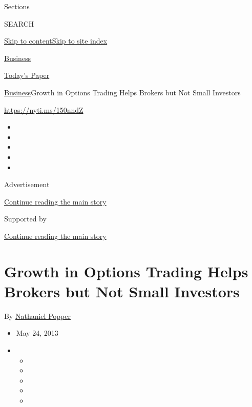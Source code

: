 Sections

SEARCH

\protect\hyperlink{site-content}{Skip to
content}\protect\hyperlink{site-index}{Skip to site index}

\href{https://www.nytimes3xbfgragh.onion/section/business}{Business}

\href{https://myaccount.nytimes3xbfgragh.onion/auth/login?response_type=cookie\&client_id=vi}{}

\href{https://www.nytimes3xbfgragh.onion/section/todayspaper}{Today's
Paper}

\href{/section/business}{Business}\textbar{}Growth in Options Trading
Helps Brokers but Not Small Investors

\url{https://nyti.ms/150nndZ}

\begin{itemize}
\item
\item
\item
\item
\item
\end{itemize}

Advertisement

\protect\hyperlink{after-top}{Continue reading the main story}

Supported by

\protect\hyperlink{after-sponsor}{Continue reading the main story}

\hypertarget{growth-in-options-trading-helps-brokers-but-not-small-investors}{%
\section{Growth in Options Trading Helps Brokers but Not Small
Investors}\label{growth-in-options-trading-helps-brokers-but-not-small-investors}}

By
\href{https://www.nytimes3xbfgragh.onion/by/nathaniel-popper}{Nathaniel
Popper}

\begin{itemize}
\item
  May 24, 2013
\item
  \begin{itemize}
  \item
  \item
  \item
  \item
  \item
  \end{itemize}
\end{itemize}

